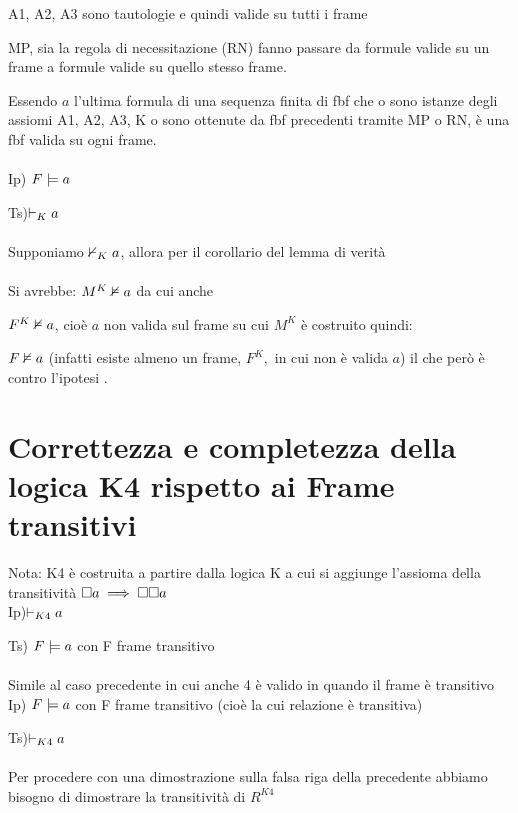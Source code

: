 A1, A2, A3 sono tautologie e quindi valide su tutti i frame

MP, sia la regola di necessitazione (RN) fanno passare da formule
valide su un frame a formule valide su quello stesso frame. 

Essendo $a$ l’ultima formula di una sequenza finita di fbf che o
sono istanze degli assiomi A1, A2, A3, K o sono ottenute da fbf precedenti
tramite MP o RN, è una fbf valida su ogni frame.\\
\\
Ip) $F\models a$

Ts)$\vdash_{K}a$ \\
\\
Supponiamo $\nvdash_{K}a$, allora per il corollario del lemma di verità\\


 \\


Si avrebbe: $M^{K}\nvDash a$ da cui anche

$F^{K}\nvDash a$, cioè $a$ non valida sul frame su cui $M^{K}$
è costruito quindi:

$F\nvDash a$ (infatti esiste almeno un frame, $F^{K},$ in cui non
è valida $a$) il che però è contro l'ipotesi \lightning.


\section{Correttezza e completezza della logica K4 rispetto ai Frame transitivi}

Nota: K4 è costruita a partire dalla logica K a cui si aggiunge l'assioma
della transitività $\square a\implies\square\square a$ \\
Ip)$\vdash_{K4}a$ 

Ts) $F\models a$ con F frame transitivo\\
\\
Simile al caso precedente in cui anche 4 è valido in quando il frame
è transitivo\\


Ip) $F\models a$ con F frame transitivo (cioè la cui relazione è
transitiva)

Ts)$\vdash_{K4}a$\\
\\
Per procedere con una dimostrazione sulla falsa riga della precedente
abbiamo bisogno di dimostrare la transitività di $R^{K4}$

